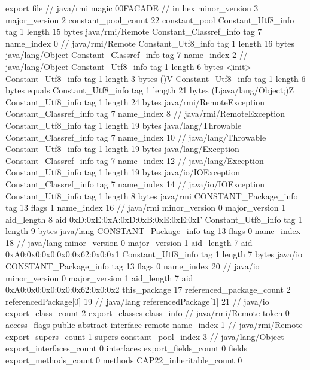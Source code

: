 export file {		// java/rmi
	magic	00FACADE		 // in hex
	minor_version	3
	major_version	2
	constant_pool_count	22
	constant_pool {
		Constant_Utf8_info {
			tag	1
			length	15
			bytes	java/rmi/Remote
		}
		Constant_Classref_info {
			tag	7
			name_index	0		// java/rmi/Remote
		}
		Constant_Utf8_info {
			tag	1
			length	16
			bytes	java/lang/Object
		}
		Constant_Classref_info {
			tag	7
			name_index	2		// java/lang/Object
		}
		Constant_Utf8_info {
			tag	1
			length	6
			bytes	<init>
		}
		Constant_Utf8_info {
			tag	1
			length	3
			bytes	()V
		}
		Constant_Utf8_info {
			tag	1
			length	6
			bytes	equals
		}
		Constant_Utf8_info {
			tag	1
			length	21
			bytes	(Ljava/lang/Object;)Z
		}
		Constant_Utf8_info {
			tag	1
			length	24
			bytes	java/rmi/RemoteException
		}
		Constant_Classref_info {
			tag	7
			name_index	8		// java/rmi/RemoteException
		}
		Constant_Utf8_info {
			tag	1
			length	19
			bytes	java/lang/Throwable
		}
		Constant_Classref_info {
			tag	7
			name_index	10		// java/lang/Throwable
		}
		Constant_Utf8_info {
			tag	1
			length	19
			bytes	java/lang/Exception
		}
		Constant_Classref_info {
			tag	7
			name_index	12		// java/lang/Exception
		}
		Constant_Utf8_info {
			tag	1
			length	19
			bytes	java/io/IOException
		}
		Constant_Classref_info {
			tag	7
			name_index	14		// java/io/IOException
		}
		Constant_Utf8_info {
			tag	1
			length	8
			bytes	java/rmi
		}
		CONSTANT_Package_info {
			tag	13
			flags	1
			name_index	16		// java/rmi
			minor_version	0
			major_version	1
			aid_length	8
			aid	0xD:0xE:0xA:0xD:0xB:0xE:0xE:0xF
		}
		Constant_Utf8_info {
			tag	1
			length	9
			bytes	java/lang
		}
		CONSTANT_Package_info {
			tag	13
			flags	0
			name_index	18		// java/lang
			minor_version	0
			major_version	1
			aid_length	7
			aid	0xA0:0x0:0x0:0x0:0x62:0x0:0x1
		}
		Constant_Utf8_info {
			tag	1
			length	7
			bytes	java/io
		}
		CONSTANT_Package_info {
			tag	13
			flags	0
			name_index	20		// java/io
			minor_version	0
			major_version	1
			aid_length	7
			aid	0xA0:0x0:0x0:0x0:0x62:0x0:0x2
		}
	}
	this_package	17
	referenced_package_count	2
	referencedPackage[0]	19		// java/lang
	referencedPackage[1]	21		// java/io
	export_class_count	2
	export_classes {
		class_info {		// java/rmi/Remote
			token	0
			access_flags	public abstract interface remote
			name_index	1		// java/rmi/Remote
			export_supers_count	1
			supers {
				constant_pool_index	3		// java/lang/Object
			}
			export_interfaces_count	0
			interfaces {
			}
			export_fields_count	0
			fields {
			}
			export_methods_count	0
			methods {
			}
			CAP22_inheritable_count	0
}}}
